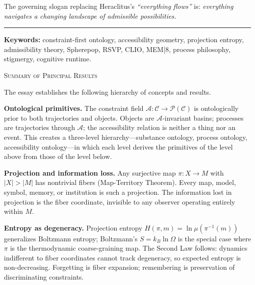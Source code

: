 \documentclass[12pt, a4paper, twoside]{article}
\theoremstyle{plain}
\theoremstyle{definition}
\theoremstyle{remark}
\begin{document}
The governing slogan replacing Heraclitus's \emph{``everything flows''} is:
\emph{everything navigates a changing landscape of admissible possibilities.}

\vspace{1.2cm}
\begin{center}
  \rule{0.35\textwidth}{0.4pt}
\end{center}
\vspace{0.8em}

\noindent\textbf{Keywords:} constraint-first ontology, accessibility geometry,
projection entropy, admissibility theory, Spherepop, RSVP, CLIO, MEM|8,
process philosophy, stigmergy, cognitive runtime.

\newpage
\thispagestyle{empty}

\vspace*{1.5cm}
\begin{center}
  {\large\scshape Summary of Principal Results}
\end{center}
\vspace{1em}

\noindent The essay establishes the following hierarchy of concepts and results.

\medskip
\noindent\textbf{Ontological primitives.}
The constraint field $\mathcal{A}: \mathcal{C} \to \mathcal{P}(\mathcal{C})$
is ontologically prior to both trajectories and objects. Objects are
$\mathcal{A}$-invariant basins; processes are trajectories through
$\mathcal{A}$; the accessibility relation is neither a thing nor an event.
This creates a three-level hierarchy---substance ontology, process ontology,
accessibility ontology---in which each level derives the primitives of the
level above from those of the level below.

\medskip
\noindent\textbf{Projection and information loss.}
Any surjective map $\pi: X \to M$ with $|X| > |M|$ has nontrivial fibers
(Map-Territory Theorem). Every map, model, symbol, memory, or institution is
such a projection. The information lost in projection is the fiber coordinate,
invisible to any observer operating entirely within $M$.

\medskip
\noindent\textbf{Entropy as degeneracy.}
Projection entropy $H(\pi, m) = \ln\mu(\pi^{-1}(m))$ generalizes Boltzmann
entropy; Boltzmann's $S = k_B \ln\Omega$ is the special case where $\pi$ is
the thermodynamic coarse-graining map. The Second Law follows: dynamics
indifferent to fiber coordinates cannot track degeneracy, so expected entropy
is non-decreasing. Forgetting is fiber expansion; remembering is preservation
of discriminating constraints.
\end{document}
